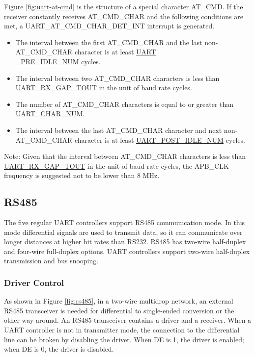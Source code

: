 \documentclass[main\_\_EN.tex]{subfiles}
\begin{document}
Figure \ref{fig:uart-at-cmd} is the structure of a special character AT\_CMD. If the receiver constantly receives AT\_CMD\_CHAR and the following conditions are met, a UART\_AT\_CMD\_CHAR\_DET\_INT interrupt is generated.

\begin{itemize}
    \item The interval between the first AT\_CMD\_CHAR and the last non-AT\_CMD\_CHAR character is at least \hyperref[fielddesc:UARTPREIDLENUM]{UART\\\_PRE\_IDLE\_NUM} cycles.
    \item The interval between two AT\_CMD\_CHAR characters is less than \hyperref[fielddesc:UARTRXGAPTOUT]{UART\_RX\_GAP\_TOUT} in the unit of baud rate cycles.
    \item The number of AT\_CMD\_CHAR characters is equal to or greater than \hyperref[fielddesc:UARTCHARNUM]{UART\_CHAR\_NUM}.
    \item The interval between the last AT\_CMD\_CHAR character and next non-AT\_CMD\_CHAR character is at least \hyperref[fielddesc:UARTPOSTIDLENUM]{UART\_POST\_IDLE\_NUM} cycles.
\end{itemize}

Note: Given that the interval between AT\_CMD\_CHAR characters is less than \hyperref[fielddesc:UARTRXGAPTOUT]{UART\_RX\_GAP\_TOUT} in the unit of baud rate cycles, the APB\_CLK frequency is suggested not to be lower than 8 MHz.

\subsection{RS485}

The five regular UART controllers support RS485 communication mode. In this mode differential signals are used to transmit data, so it can communicate over longer distances at higher bit rates than RS232. RS485 has two-wire half-duplex and four-wire full-duplex options. UART controllers support two-wire half-duplex transmission and bus snooping.


\subsubsection{Driver Control}

As shown in Figure \ref{fig:rs485}, in a two-wire multidrop network, an external RS485 transceiver is needed for differential to single-ended conversion or the other way around. An RS485 transceiver contains a driver and a receiver. When a UART controller is not in transmitter mode, the connection to the differential line can be broken by disabling the driver. When DE is 1, the driver is enabled; when DE is 0, the driver is disabled.
\end{document}
